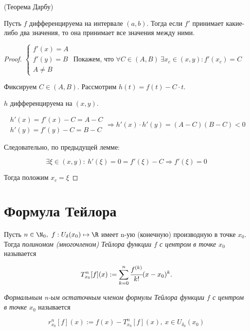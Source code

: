 \begin{theorem}
	\hypertarget{thrm6.5}{(Теорема Дарбу)} Пусть $f$ дифференцируема на интервале $(a, b)$. Тогда если $f'$ принимает какие-либо два значения, то она принимает все значения между ними.  
\end{theorem}
\begin{proof}
	$\begin{cases}
		f'(x) = A \\
		f'(y) = B \\
		A \neq B
	\end{cases}$ Покажем, что $\forall C\in \left(A, B\right) \ \exists x_{c} \in (x,y): f'(x_{c}) = C $
	
	Фиксируем $C \in \left(A, B \right)$. Рассмотрим $h(t) = f(t) - C\cdot t$.
	
	$h$ дифференцируема на $(x,y)$. 
	
	$$\begin{gathered}
		h'(x) = f'(x) - C = A - C \\
		h'(y) = f'(y) - C = B-C
	\end{gathered}
	\Rightarrow h'(x)\cdot h'(y) = \left(A-C\right)\left(B-C\right) < 0 $$
	
	Следовательно, по предыдущей лемме:
	
	$$\exists \xi \in (x,y): \ h'(\xi) = 0 = f'(\xi) - C \Rightarrow f'(\xi) = 0$$
	
	Тогда положим $x_{c} = \xi$
\end{proof}

\section{Формула Тейлора}

\begin{definition}
	Пусть $n \in \N_{0},$ $f: U_{\delta}(x_{0})\mapsto \R$ имеет n-ую (конечную) производную в точке $x_{0}$. Тогда \textit{полиномом (многочленом) Тейлора функции $f$ с центром в точке $x_{0}$} называется
	
	$$T_{x_{0}}^{n} [f](x) := \sum\limits_{k = 0}^n \cfrac{f^{(k)}}{k!}(x-x_{0})^{k}.$$ 
\end{definition}

\begin{definition}
	\textit{Формальным n-ым остаточным членом формулы Тейлора функции $f$ с центром в точке $x_{0}$} называется 
	
	$$r_{x_{0}}^{n} [f](x):= f(x) -T_{x_{0}}^{n} [f](x),\ x\in U_{\delta_{0}}(x_{0}) $$
\end{definition}

